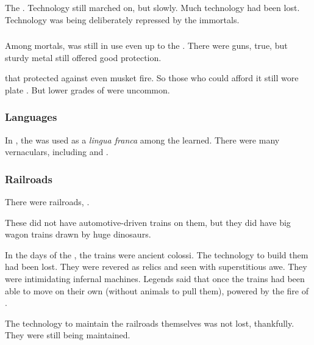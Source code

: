 The . 
Technology still marched on, but slowly.
Much technology had been lost. 
Technology was being deliberately repressed by the immortals. 





\subsubsection{\Armour}
Among mortals, \armour was still in use even up to the \thirdbanewar. 
There were guns, true, but sturdy metal \armour still offered good protection. 

 that protected against even musket fire. 
So those who could afford it still wore plate \armour.
But lower grades of \armour were uncommon.





\subsubsection{Languages}
In \Velcad, the  was used as a \emph{lingua franca} among the learned. 
There were many vernaculars, including  and . 





\subsubsection{Railroads}
There were railroads, . 

These did not have automotive-driven trains on them, but they did have big wagon trains drawn by huge dinosaurs.

In the days of the \thirdbanewar, the trains were ancient colossi. 
The technology to build them had been lost. 
They were revered as relics and seen with superstitious awe. 
They were intimidating infernal machines. 
Legends said that once the trains had been able to move on their own (without animals to pull them), powered by the fire of \daemons. 

The technology to maintain the railroads themselves was not lost, thankfully. 
They were still being maintained. 

